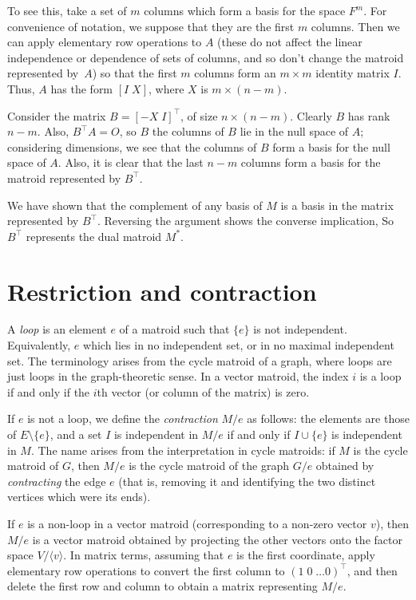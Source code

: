 \documentclass[12pt]{article}
\begin{document}
To see this, take a set of $m$ columns which form a basis for the
space $F^m$. For convenience of notation, we suppose that they are
the first $m$ columns. Then we can apply elementary row operations
to $A$ (these do not affect the linear independence or dependence
of sets of columns, and so don't change the matroid represented by~$A$)
so that the first $m$ columns form an $m\times m$ identity matrix $I$.
Thus, $A$ has the form $[I\;X]$, where $X$ is $m\times(n-m)$.

Consider the matrix $B=[-X\;I]^\top$, of size $n\times(n-m)$. Clearly
$B$ has rank $n-m$. Also, $B^\top A=O$, so $B$ the columns of $B$ lie
in the null space of $A$; considering dimensions, we see that the columns
of $B$ form a basis for the null space of $A$. Also, it is clear that the
last $n-m$ columns form a basis for the matroid represented by $B^\top$.

We have shown that the complement of any basis of $M$ is a basis in the
matrix represented by $B^\top$. Reversing the argument shows the converse
implication, So $B^\top$ represents the dual matroid $M^*$.

\section{Restriction and contraction}

A \emph{loop} is an element $e$ of a matroid such that $\{e\}$
is not independent. Equivalently, $e$ which lies in no independent
set, or in no maximal independent set. The terminology arises
from the cycle matroid of a graph, where loops are just loops in
the graph-theoretic sense. In a vector matroid, the index $i$
is a loop if and only if the $i$th vector (or column of the
matrix) is zero.

If $e$ is not a loop, we define the \emph{contraction} $M/e$ as
follows: the elements are those of $E\setminus\{e\}$, and a set
$I$ is independent in $M/e$ if and only if $I\cup\{e\}$ is
independent in $M$. The name arises from the interpretation
in cycle matroids: if $M$ is the cycle matroid of $G$, then
$M/e$ is the cycle matroid of the graph $G/e$ obtained by
\emph{contracting} the edge $e$ (that is, removing it and
identifying the two distinct vertices which were its ends).

If $e$ is a non-loop in a vector matroid (corresponding to a
non-zero vector $v$), then $M/e$ is a vector matroid obtained
by projecting the other vectors onto the factor space
$V/\langle v\rangle$. In matrix terms, assuming that $e$ is the
first coordinate, apply elementary row operations to convert the
first column to $(1\;0\;\ldots0)^\top$, and then delete the
first row and column to obtain a matrix representing $M/e$.
\end{document}
